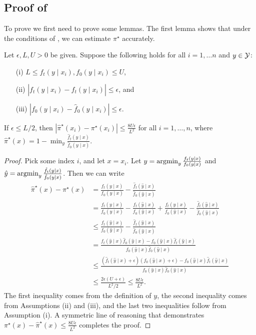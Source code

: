 \subsection{Proof of }

To prove  we first need to prove some lemmas. The first lemma shows that under the conditions of ,  we can estimate $\pi^\star$ accurately.

\begin{lemma}
\label{lem:w_star-estimate}
Let $\epsilon, L, U > 0$ be given. Suppose the following holds for all $i=1, \ldots n$ and $y \in \mathcal{Y}$:
\begin{itemize}
    \item[(i)] $L \leq f_t(y \mid x_i), f_0(y \mid x_i) \leq U$,
    \item [(ii)] $|f_t(y \mid x_i) - \hat{f}_t(y \mid x_i)| \leq \epsilon$, and
    \item[(iii)] $|f_0(y \mid x_i) - \hat{f}_0(y \mid x_i)| \leq \epsilon$.
\end{itemize}
If $\epsilon \leq L/2$, then $|\hat{\pi}^\star(x_i) - \pi^\star(x_i)| \leq \frac{8 U \epsilon}{L^2}$ for all $i=1,\ldots, n$, where
$ \hat{\pi}^\star(x) = 1 - \min_y \frac{\hat{f}_t(y \mid x)}{\hat{f}_0(y \mid x)} .$
\end{lemma}
\begin{proof}
Pick some index $i$, and let $x = x_i$. Let $y = \operatorname{argmin}_y \frac{f_t(y \mid x)}{f_0(y \mid x)}$ and $\hat{y} = \operatorname{argmin}_y \frac{\hat{f}_t(y \mid x)}{\hat{f}_0(y \mid x)}$. Then we can write
\begin{align*}
\hat{\pi}^\star(x) - \pi^\star(x)
&=  \frac{f_t(y \mid x)}{f_0(y \mid x)} - \frac{\hat{f}_t(\hat{y} \mid x)}{\hat{f}_0(\hat{y} \mid x)}  \\
&= \frac{f_t(y \mid x)}{f_0(y \mid x)} - \frac{f_t(\hat{y} \mid x)}{f_0(\hat{y} \mid x)} + \frac{f_t(\hat{y} \mid x)}{f_0(\hat{y} \mid x)} - \frac{\hat{f}_t(\hat{y} \mid x)}{\hat{f}_0(\hat{y} \mid x)} \\
&\leq \frac{f_t(\hat{y} \mid x)}{f_0(\hat{y} \mid x)} - \frac{\hat{f}_t(\hat{y} \mid x)}{\hat{f}_0(\hat{y} \mid x)} \\
&= \frac{f_t(\hat{y} \mid x) \hat{f}_0(\hat{y} \mid x) - f_0(\hat{y} \mid x)\hat{f}_t(\hat{y} \mid x)}{f_0(\hat{y} \mid x) \hat{f}_0(\hat{y} \mid x)} \\
&\leq \frac{(\hat{f}_t(\hat{y} \mid x) + \epsilon )(f_0(\hat{y} \mid x) + \epsilon) - f_0(\hat{y} \mid x)\hat{f}_t(\hat{y} \mid x)}{f_0(\hat{y} \mid x) \hat{f}_0(\hat{y} \mid x)} \\
&\leq \frac{2\epsilon(U + \epsilon)}{L^2/2} \leq \frac{8U\epsilon}{L^2}.
\end{align*}
The first inequality comes from the definition of $y$, the second inequality comes from Assumptions (ii) and (iii), and the last two inequalities follow from Assumption (i). A symmetric line of reasoning that demonstrates $\pi^\star(x) - \hat{\pi}^\star(x) \leq \frac{8U\epsilon}{L^2}$ completes the proof.
\end{proof}

